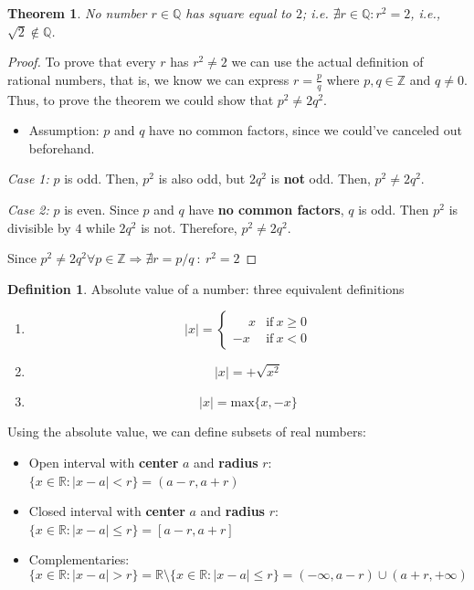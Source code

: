 \documentclass[a4paper,11pt]{article}
\theoremstyle{definition}
\newtheorem{definition}{Definition}
\theoremstyle{plain}
\newtheorem{theorem}{Theorem}
\begin{document}
\begin{theorem} 
No number \(r\in\mathbb{Q}\) has square equal to
\(2\); i.e. \(\nexists r\in\mathbb{Q} : r^2 = 2\), i.e., \(\sqrt{2}\notin\mathbb{Q}\).
\end{theorem}

\begin{proof}
To prove that every \(r\) has \(r^2\neq 2\) we can use
the actual definition of rational numbers, that is, we know we can
express \(r = \frac{p}{q}\) where \(p,q\in\mathbb{Z}\) and \(q\neq 0\).
Thus, to prove the theorem we could show that \(p^2\neq 2q^2\).


\begin{itemize}
\item
  Assumption: \(p\) and \(q\) have no common factors, since we could've
  canceled out beforehand.
\end{itemize}

\emph{Case 1:} \(p\) is odd. Then, \(p^2\) is also odd, but \(2q^2\) is
\textbf{not} odd. Then, \(p^2\neq 2q^2\).

\emph{Case 2:} \(p\) is even. Since \(p\) and \(q\) have \textbf{no
common factors}, \(q\) is odd. Then \(p^2\) is divisible by \(4\) while
\(2q^2\) is not. Therefore, \(p^2\neq 2q^2\).

Since
\(p^2\neq 2q^2 \forall p\in\mathbb{Z}\Rightarrow \nexists r = p / q \ : \ r^2 = 2\)
\end{proof}

\begin{definition}
Absolute value of a number: three equivalent definitions

\begin{enumerate}
\def\labelenumi{\arabic{enumi}.}
\item
  \[
  \lvert x \rvert =
  \begin{cases}
  \phantom{-}x & \text{if} \ x\geq 0 \\
  -x & \text{if} \ x < 0 
  \end{cases}
  \]
\item
  \[
  \lvert x \rvert = + \sqrt{x^2}
  \]
\item
  \[
  \lvert x \rvert = \text{max}\{x, -x\}
  \]
\end{enumerate}
\end{definition}


Using the absolute value, we can define subsets of real numbers:

\begin{itemize}
	\item
  Open interval with \textbf{center} \(a\) and \textbf{radius} \(r\):
  \(\{x\in\mathbb{R} : \lvert x-a \rvert < r\} = (a-r,a+r)\)
\item
  Closed interval with \textbf{center} \(a\) and \textbf{radius} \(r\):
  \(\{x\in\mathbb{R} : \lvert x-a \rvert \leq r\} = [a-r,a+r]\)
\item
  Complementaries: \[
  \{x\in\mathbb{R} : \lvert x-a \rvert > r\} = \mathbb{R}\setminus\{x\in\mathbb{R}: \lvert x-a \rvert \leq r\} = (-\infty,a-r)\cup(a+r,+\infty)
  \]
\end{itemize}
\end{document}
